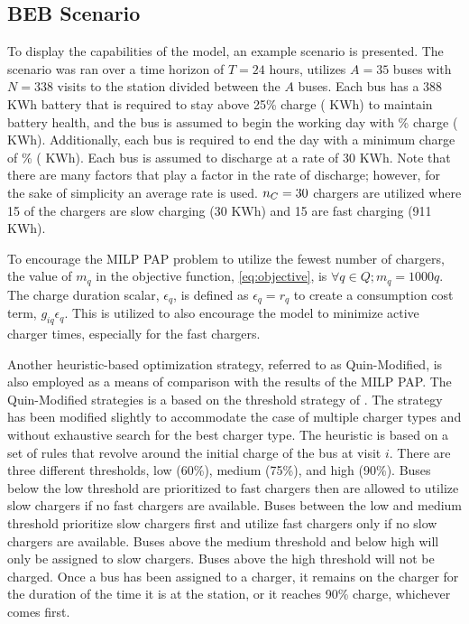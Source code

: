 \documentclass[utf8]{FrontiersinHarvard}
\let\cite\citep                                                                 %
\newcommand{\A}{35 }                                                            %
\newcommand{\N}{338 }                                                           %
\newcommand{\acharge}{0.9}                                                      %
\newcommand{\bcharge}{0.7 }                                                     %
\newcommand{\mincharge}{25\% }                                                  %
\newcommand{\batsize}{388 }                                                     %
\newcommand{\fast}{15 }                                                         %
\newcommand{\slow}{15 }                                                         %
\newcommand{\fasts}{911 }                                                       %
\newcommand{\slows}{30 }                                                        %
\begin{document}
\subsection{BEB Scenario}

To display the capabilities of the model, an example scenario is presented. The scenario was ran over a time horizon of
$T=24$ hours, utilizes $A = \A$ buses with $N = \N$ visits to the station divided between the $A$ buses. Each bus has a
\batsize KWh battery that is required to stay above \mincharge charge (\fpeval{\batsize * \mincharge / 100} KWh) to
maintain battery health, and the bus is assumed to begin the working day with \fpeval{\acharge*100}\% charge
(\fpeval{\acharge * \batsize} KWh). Additionally, each bus is required to end the day with a minimum charge of
\fpeval{\bcharge * 100}\% (\fpeval{\bcharge * \batsize} KWh). Each bus is assumed to discharge at a rate of 30 KWh. Note
that there are many factors that play a factor in the rate of discharge; however, for the sake of simplicity an average
rate is used. $n_C = \fpeval{\fast + \slow}$ chargers are utilized where \slow of the chargers are slow charging (\slows
KWh) and \fast are fast charging (\fasts KWh).

To encourage the MILP PAP problem to utilize the fewest number of chargers, the value of $m_q$ in the objective
function, \eqref{eq:objective}, is $\forall q \in Q; m_q = 1000q$. The charge duration scalar, $\epsilon_q$, is defined as $\epsilon_q = r_q$
to create a consumption cost term, $g_{iq}\epsilon_q$. This is utilized to also encourage the model to minimize active charger
times, especially for the fast chargers.

Another heuristic-based optimization strategy, referred to as Quin-Modified, is also employed as a means of comparison
with the results of the MILP PAP. The Quin-Modified strategies is a based on the threshold strategy of \cite{Qin2016}.
The strategy has been modified slightly to accommodate the case of multiple charger types and without exhaustive search
for the best charger type. The heuristic is based on a set of rules that revolve around the initial charge of the bus at
visit $i$. There are three different thresholds, low (60\%), medium (75\%), and high (90\%). Buses below the low
threshold are prioritized to fast chargers then are allowed to utilize slow chargers if no fast chargers are available.
Buses between the low and medium threshold prioritize slow chargers first and utilize fast chargers only if no slow
chargers are available. Buses above the medium threshold and below high will only be assigned to slow chargers. Buses
above the high threshold will not be charged. Once a bus has been assigned to a charger, it remains on the charger for
the duration of the time it is at the station, or it reaches 90\% charge, whichever comes first.
\end{document}

